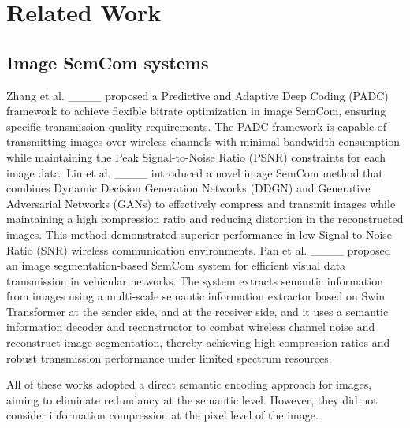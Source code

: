 \section{Related Work}
\subsection{Image SemCom systems}
Zhang et al. ____ proposed a Predictive and Adaptive Deep Coding (PADC) framework to achieve flexible bitrate optimization in image SemCom, ensuring specific transmission quality requirements. The PADC framework is capable of transmitting images over wireless channels with minimal bandwidth consumption while maintaining the Peak Signal-to-Noise Ratio (PSNR) constraints for each image data. 
Liu et al. ____ introduced a novel image SemCom method that combines Dynamic Decision Generation Networks (DDGN) and Generative Adversarial Networks (GANs) to effectively compress and transmit images while maintaining a high compression ratio and reducing distortion in the reconstructed images. This method demonstrated superior performance in low Signal-to-Noise Ratio (SNR) wireless communication environments. 
Pan et al. ____ proposed an image segmentation-based SemCom system for efficient visual data transmission in vehicular networks. The system extracts semantic information from images using a multi-scale semantic information extractor based on Swin Transformer at the sender side, and at the receiver side, and it uses a semantic information decoder and reconstructor to combat wireless channel noise and reconstruct image segmentation, thereby achieving high compression ratios and robust transmission performance under limited spectrum resources.

All of these works adopted a direct semantic encoding approach for images, aiming to eliminate redundancy at the semantic level. However, they did not consider information compression at the pixel level of the image.

